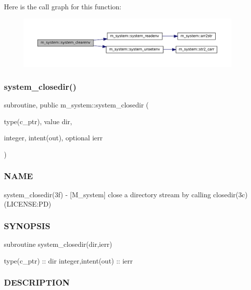 Here is the call graph for this function\+:\nopagebreak
\begin{figure}[H]
\begin{center}
\leavevmode
\includegraphics[width=350pt]{namespacem__system_a9c34787b170ab8d41000d7c3acb60736_cgraph}
\end{center}
\end{figure}
\mbox{\label{namespacem__system_acd442b52c64fc50482bc08b0ac8a50d1}} 
\subsubsection{\texorpdfstring{system\+\_\+closedir()}{system\_closedir()}}
{\footnotesize\ttfamily subroutine, public m\+\_\+system\+::system\+\_\+closedir (\begin{DoxyParamCaption}\item[{type(c\+\_\+ptr), value}]{dir,  }\item[{integer, intent(out), optional}]{ierr }\end{DoxyParamCaption})}



\subsubsection*{N\+A\+ME}

system\+\_\+closedir(3f) -\/ \mbox{[}M\+\_\+system\mbox{]} close a directory stream by calling closedir(3c) (L\+I\+C\+E\+N\+SE\+:PD) \subsubsection*{S\+Y\+N\+O\+P\+S\+IS}

subroutine system\+\_\+closedir(dir,ierr)

type(c\+\_\+ptr) \+:\+: dir integer,intent(out) \+:\+: ierr \subsubsection*{D\+E\+S\+C\+R\+I\+P\+T\+I\+ON}

